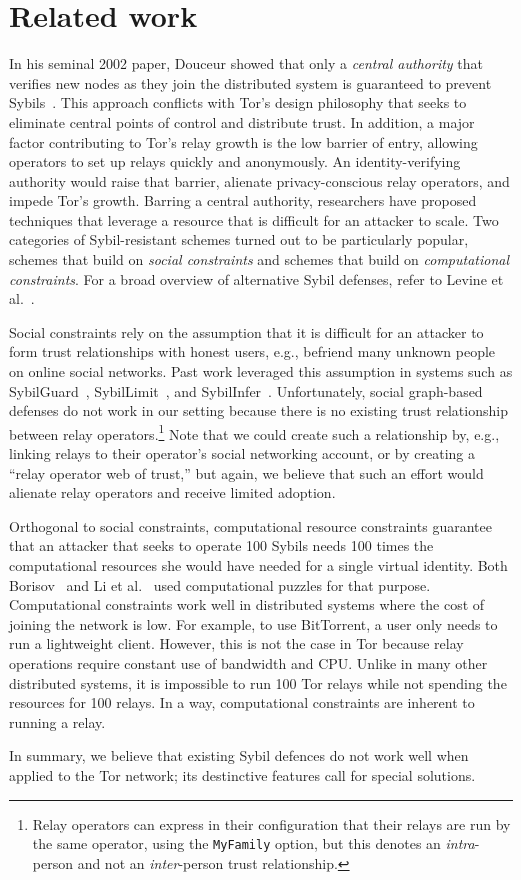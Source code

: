 \section{Related work}
\label{sec:related_work}
In his seminal 2002 paper, Douceur showed that only a \emph{central authority}
that verifies new nodes as they join the distributed system is guaranteed to
prevent Sybils~\cite{Douceur2002a}.  This approach conflicts with Tor's design
philosophy that seeks to eliminate central points of control and distribute
trust.  In addition, a major factor contributing to Tor's relay growth is the
low barrier of entry, allowing operators to set up relays quickly and
anonymously.  An identity-verifying authority would raise that barrier, alienate
privacy-conscious relay operators, and impede Tor's growth.  Barring a central
authority, researchers have proposed techniques that leverage a resource that is
difficult for an attacker to scale.  Two categories of Sybil-resistant schemes
turned out to be particularly popular, schemes that build on \emph{social
constraints} and schemes that build on \emph{computational constraints}.  For a
broad overview of alternative Sybil defenses, refer to Levine et
al.~\cite{Levine2006a}.

Social constraints rely on the assumption that it is difficult for an attacker
to form trust relationships with honest users, e.g., befriend many unknown
people on online social networks.  Past work leveraged this assumption in
systems such as SybilGuard~\cite{Yu2006a}, SybilLimit~\cite{Yu2008a}, and
SybilInfer~\cite{Danezis2009a}.  Unfortunately, social graph-based defenses
do not work in our setting because there is no existing trust relationship
between relay operators.\footnote{Relay operators can express in their
configuration that their relays are run by the same operator, using the
\texttt{MyFamily} option, but this denotes an \emph{intra}-person and not an
\emph{inter}-person trust relationship.} Note that we could create such a
relationship by, e.g., linking relays to their operator's social networking
account, or by creating a ``relay operator web of trust,'' but again, we
believe that such an effort would alienate relay operators and receive limited
adoption.

Orthogonal to social constraints, computational resource constraints guarantee
that an attacker that seeks to operate 100 Sybils needs 100 times the
computational resources she would have needed for a single virtual identity.
Both Borisov~\cite{Borisov2006a} and Li et al.~\cite{Li2012a} used computational
puzzles for that purpose.  Computational constraints work well in distributed
systems where the cost of joining the network is low.  For example, to use
BitTorrent, a user only needs to run a lightweight client.  However, this is not
the case in Tor because relay operations require constant use of bandwidth and
CPU.  Unlike in many other distributed systems, it is impossible to run 100 Tor
relays while not spending the resources for 100 relays.  In a way, computational
constraints are inherent to running a relay.

In summary, we believe that existing Sybil defences do not work well when
applied to the Tor network; its destinctive features call for special solutions.
